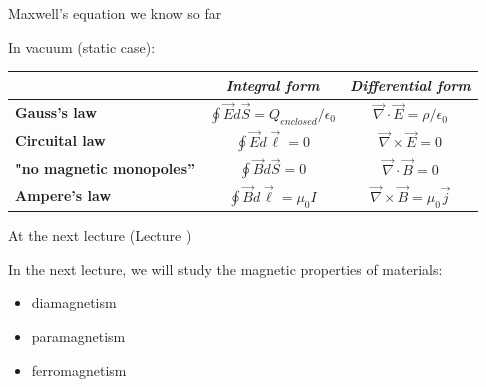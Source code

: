 %
%
%

\begin{frame}{Maxwell's equation we know so far}

In vacuum (static case):

\begin{center}
 {
  \begin{table}[H]
    \begin{tabular}{|l|c|c|}
      \hline
          & {\it Integral form} & {\it Differential form} \\
      \hline
      {\bf Gauss's law} &
        $\oint \vec{E} d\vec{S} = Q_{enclosed} / \epsilon_0$ &
        $\vec{\nabla} \cdot \vec{E} = \rho / \epsilon_0$ \\

      {\bf Circuital law} &
        $\oint \vec{E} d\vec{\ell} = 0$ &
        $\vec{\nabla} \times \vec{E} = 0$ \\

      {\bf "no magnetic monopoles''} &
        $\oint \vec{B} d\vec{S} = 0$ &
        $\vec{\nabla} \cdot \vec{B} = 0$ \\

      {\bf Ampere's law} &
        $\oint \vec{B} d\vec{\ell} = \mu_{0} I $ &
        $\vec{\nabla} \times \vec{B} = \mu_{0} \vec{j}$ \\

      \hline
    \end{tabular}
  \end{table}
 }
\end{center}

\end{frame}


%
%

\renewcommand{\lecturesummarytitle}{Main points to remember }


%
%

\begin{frame}{At the next lecture (Lecture \nextlecture)}

In the next lecture, we will study the magnetic properties of materials:
\vspace{0.2cm}
\begin{itemize}
  \item diamagnetism
  \item paramagnetism
  \item ferromagnetism
\end{itemize}

\end{frame}

